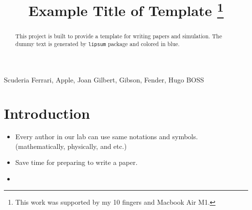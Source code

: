 \documentclass[conference]{IEEEtran}
\begin{document}
\title{
    Example Title of Template
    \thanks{
        This work was supported by my 10 fingers and Macbook Air M1.
    }
}

\author{
\and
}

\maketitle 
\thispagestyle{empty}

\begin{abstract}
	This project is built to provide a template for writing papers and simulation.
	The dummy text is generated by \texttt{lipsum} package and colored in blue.
	\color{blue}\lipsum[1]\color{black}
\end{abstract}

\begin{IEEEkeywords}
	Scuderia Ferrari, Apple, Joan Gilbert, Gibson, Fender, Hugo BOSS
\end{IEEEkeywords}

\section{Introduction}

\begin{itemize}
    \item Every author in our lab can use same notations and symbols. (\eg mathematically, physically, and etc.)
    \item Save time for preparing to write a paper.
    \item \cite{Arefinia:2017aa}    
\end{itemize}
\end{document}
